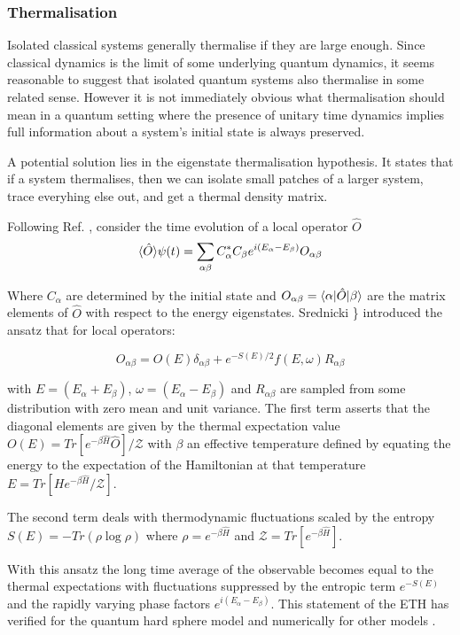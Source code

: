 \hypertarget{thermalisation}{%
\subsubsection{Thermalisation}\label{thermalisation}}

Isolated classical systems generally thermalise if they are large enough. Since classical dynamics is the limit of some underlying quantum dynamics, it seems reasonable to suggest that isolated quantum systems also thermalise in some related sense. However it is not immediately obvious what thermalisation should mean in a quantum setting where the presence of unitary time dynamics implies full information about a system's initial state is always preserved.

A potential solution lies in the eigenstate thermalisation hypothesis. It states that if a system thermalises, then we can isolate small patches of a larger system, trace everyhing else out, and get a thermal density matrix.

Following Ref. \textcite{abaninRecentProgressManybody2017}, consider the time evolution of a local operator \(\hat{O}\) \[ \langle \hat{O} \rangle{\psi(t)} = \sum_{\alpha \beta} C^*_\alpha C_\beta e^{i(E_\alpha - E_\beta)} O_{\alpha \beta}\]

Where \(C_\alpha\) are determined by the initial state and \(O_{\alpha \beta} = \langle \alpha | \hat{O} | \beta \rangle\) are the matrix elements of \(\hat{O}\) with respect to the energy eigenstates. Srednicki \textcite{srednickiChaosQuantumThermalization1994}\} introduced the ansatz that for local operators:

\[O_{\alpha \beta} = O(E)\delta_{\alpha\beta} + e^{-S(E)/2} f(E,\omega) R_{\alpha\beta}\]

with \(E = (E_\alpha + E_\beta)\), \(\omega = (E_\alpha - E_\beta)\) and \(R_{\alpha\beta}\) are sampled from some distribution with zero mean and unit variance. The first term asserts that the diagonal elements are given by the thermal expectation value \(O(E) = Tr[e^{-\beta \hat{H}} \hat{O}]/\mathcal{Z}\) with \(\beta\) an effective temperature defined by equating the energy to the expectation of the Hamiltonian at that temperature \(E = Tr[H e^{-\beta \hat{H}}/\mathcal{Z}]\).

The second term deals with thermodynamic fluctuations scaled by the entropy \(S(E) = -Tr(\rho \log \rho)\) where \(\rho = e^{-\beta \hat{H}}\) and \(\mathcal{Z} = Tr[e^{-\beta \hat{H}}]\).

With this ansatz the long time average of the observable becomes equal to the thermal expectations with fluctuations suppressed by the entropic term \(e^{-S(E)}\) and the rapidly varying phase factors \(e^{i(E_\alpha - E_\beta)}\). This statement of the ETH has verified for the quantum hard sphere model \textcite{srednickiChaosQuantumThermalization1994} and numerically for other models \autocite{khatamiFluctuationDissipationTheoremIsolated2013,dalessioQuantumChaosEigenstate2016}.

